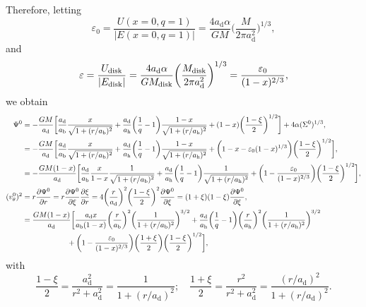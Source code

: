 \documentclass[11pt]{article}
\newcommand{\vt}{v_{\theta}}
\newcommand{\Md}{M_{\rm{disk}}}
\newcommand{\ad}{a_{\mathrm{d}}}
\newcommand{\ab}{a_{\mathrm{b}}}
\newcommand{\ah}{a_{\mathrm{h}}}
\begin{document}
Therefore, letting  $$\varepsilon_0 = \frac{U(x=0,q=1)}{|E(x=0,q=1)|} =\frac{4\ad \alpha }{GM} \bigg(\frac{M}{2\pi \ad^2}\bigg)^{1/3},$$
and
$$\varepsilon = \frac{U_{\mathrm{disk}}}{|E_{\mathrm{disk}}|} =\frac{4\ad \alpha }{G\Md} \bigg(\frac{\Md}{2\pi \ad^2}\bigg)^{1/3} =  \frac{\varepsilon_0}{(1-x)^{2/3}},$$  
we obtain
\begin{align}
\Psi^0 &=  -\frac{G M }{\ad  } \bigg[\frac{\ad}{\ab}\frac{x}{\sqrt{1+(r/\ab)^2}}+\frac{\ad}{\ah}\bigg(\frac{1}{q}-1\bigg)\frac{1-x}{\sqrt{1+(r/\ah)^2}}+(1-x)\bigg(\frac{1-\xi}{2}\bigg)^{1/2}\bigg]+ 4\alpha  (\Sigma^0)^{1/3} ,\\
{}&=  -\frac{G M }{\ad  } \bigg[\frac{\ad}{\ab}\frac{x}{\sqrt{1+(r/\ab)^2}}+\frac{\ad}{\ah}\bigg(\frac{1}{q}-1\bigg)\frac{1-x}{\sqrt{1+(r/\ah)^2}}+\bigg(1-x-\varepsilon_0 (1-x)^{1/3}\bigg)\bigg(\frac{1-\xi}{2}\bigg)^{1/2} \bigg],\\
{}&=  -\frac{G M (1-x)}{\ad  } \bigg[\frac{\ad}{\ab}\frac{x}{1-x}\frac{1}{\sqrt{1+(r/\ab)^2}}+\frac{\ad}{\ah}\bigg(\frac{1}{q}-1\bigg)\frac{1}{\sqrt{1+(r/\ah)^2}}+\bigg(1-\frac{\varepsilon_0}{ (1-x)^{2/3}}\bigg)\bigg(\frac{1-\xi}{2}\bigg)^{1/2} \bigg],\\
(\vt^0)^2 &= r \frac{\partial \Psi^0}{\partial r} =r \frac{\partial \Psi^0}{\partial \xi} \frac{\partial \xi}
{\partial r} = 4\bigg(\frac{r}{\ad}\bigg)^2    \bigg(\frac{1-\xi}{2}\bigg)^2 \frac{\partial \Psi^0}{\partial \xi}= (1+\xi) (1-\xi) \frac{\partial \Psi^0}{\partial \xi}  ,\\
&=\frac{GM(1-x)}{\ad}\bigg[\frac{\ad x}{\ab(1-x)}\bigg( \frac{r}{\ab}\bigg)^2 \bigg(\frac{1}{1+(r/\ab)^2}\bigg)^{3/2}+\frac{\ad}{\ah}\bigg(\frac{1}{q}-1\bigg)\bigg( \frac{r}{\ah}\bigg)^2 \bigg(\frac{1}{1+(r/\ah)^2}\bigg)^{3/2} \notag \\
&\quad\quad\quad\quad\quad\quad+\bigg(1-\frac{\varepsilon_0}{ (1-x)^{2/3}}\bigg)\bigg(\frac{1+\xi}{2}\bigg) \bigg(\frac{1-\xi}{2}\bigg)^{1/2}  \bigg], 
\end{align}
with
$$\frac{1-\xi}{2}= \frac{\ad^2}{r^2+\ad^2}= \frac{1}{1+(r/\ad)^2}; \quad \frac{1+\xi}{2}= \frac{r^2}{r^2+\ad^2}= \frac{(r/\ad)^2}{1+(r/\ad)^2}.$$
\end{document}

